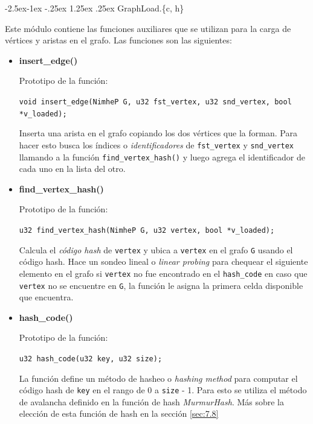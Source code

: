 \documentclass[11pt,a4paper]{article}
\makeatletter
\renewcommand\paragraph{\@startsection{paragraph}{4}{\z@}%
            {-2.5ex\@plus -1ex \@minus -.25ex}%
            {1.25ex \@plus .25ex}%
            {\normalfont\normalsize\bfseries}}
\theoremstyle{plain}
\makeatother
\begin{document}
				\paragraph{GraphLoad.\{c, h\}}
				\label{sec:3.2.1.3}

Este módulo contiene las funciones auxiliares que se utilizan para la carga de vértices y aristas en el grafo. Las funciones son las siguientes:

\begin{itemize}
\item{\textbf{{insert\_edge()}}}

Prototipo de la función:

\texttt{void insert\_edge(NimheP G, u32 fst\_vertex, u32 snd\_vertex, bool *v\_loaded);}

Inserta una arista en el grafo copiando los dos vértices que la forman. Para hacer esto busca los índices o \emph{identificadores} de \texttt{fst\_vertex} y \texttt{snd\_vertex} llamando a la función \texttt{find\_vertex\_hash()} y luego agrega el identificador de cada uno en la lista del otro.

\item{\textbf{{find\_vertex\_hash()}}}

Prototipo de la función:

\texttt{u32 find\_vertex\_hash(NimheP G, u32\ vertex, bool *v\_loaded);}

Calcula el \emph{código hash} de \texttt{vertex} y ubica a \texttt{vertex} en el grafo \texttt{G} usando el código hash. Hace un sondeo lineal o \emph{linear probing} para chequear el siguiente elemento en el grafo si \texttt{vertex} no fue encontrado en el \texttt{hash\_code} en caso que \texttt{vertex} no se encuentre en \texttt{G}, la función le asigna la primera celda disponible que encuentra.

\item{\textbf{{hash\_code()}}}

Prototipo de la función:

\texttt{u32 hash\_code(u32 key, u32 size);}

La función define un método de hasheo o \emph{hashing method} para computar el código hash de \texttt{key} en el rango de 0 a \texttt{size} - 1. Para esto se utiliza el método de avalancha definido en la función de hash \emph{MurmurHash}. Más sobre la elección de esta función de hash en la sección \ref{sec:7.8}

\end{itemize}
\end{document}
